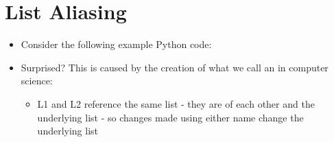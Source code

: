 \documentclass[letterpaper,10pt,english]{sphinxmanual}
\begin{document}
\section{List Aliasing}
\label{\detokenize{lecture_notes/lec10_lists2:list-aliasing}}\begin{itemize}
\item {} 
Consider the following example Python code:

%
\begin{sphinxVerbatim}[commandchars=\\\{\}]
  \PYG{p}{[}    \PYG{p}{]}
  
  \PYG{p}{[}    \PYG{p}{]}
  
\PYG{p}{[}\PYG{p}{]}  
\end{sphinxVerbatim}

\item {} 
Surprised? This is caused by the creation of what we call an
 in computer science:
\begin{itemize}
\item {} 
L1 and L2 reference the same list - they are  of each
other and the underlying list - so changes made using either
name change the underlying list


\end{itemize}
\end{itemize}
\end{document}
